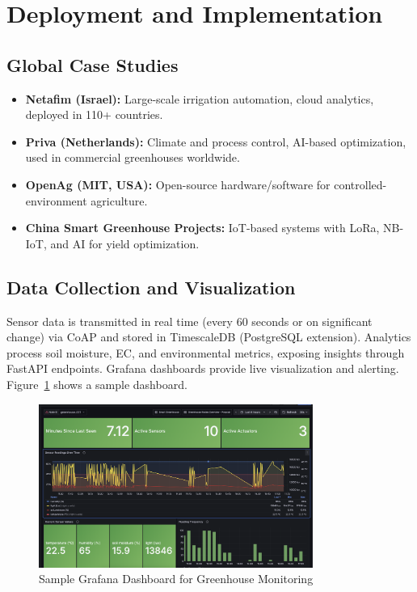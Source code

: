 \documentclass[12pt,a4paper]{article}
\begin{document}
\section{Deployment and Implementation}


\subsection{Global Case Studies}
\begin{itemize}
    \item \textbf{Netafim (Israel):} Large-scale irrigation automation, cloud analytics, deployed in 110+ countries.
    \item \textbf{Priva (Netherlands):} Climate and process control, AI-based optimization, used in commercial greenhouses worldwide.
    \item \textbf{OpenAg (MIT, USA):} Open-source hardware/software for controlled-environment agriculture.
    \item \textbf{China Smart Greenhouse Projects:} IoT-based systems with LoRa, NB-IoT, and AI for yield optimization.
\end{itemize}

\subsection{Data Collection and Visualization}
Sensor data is transmitted in real time (every 60 seconds or on significant change) via CoAP and stored in TimescaleDB (PostgreSQL extension). Analytics process soil moisture, EC, and environmental metrics, exposing insights through FastAPI endpoints. Grafana dashboards provide live visualization and alerting. Figure~\ref{fig:dashboard} shows a sample dashboard.

\begin{figure}[H]
    \centering
    \includegraphics[width=0.8\textwidth]{images/NodeDashboard.png}
    \caption{Sample Grafana Dashboard for Greenhouse Monitoring}\label{fig:dashboard}
\end{figure}
\end{document}
